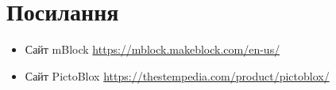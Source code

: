 \documentclass[oneside, final]{article}
\begin{document}
\section{Посилання}
\begin{itemize}
	\item Сайт mBlock \url{https://mblock.makeblock.com/en-us/}
	\item Сайт PictoBlox \url{https://thestempedia.com/product/pictoblox/}
\end{itemize}
\end{document}
